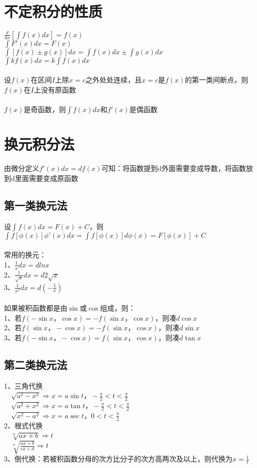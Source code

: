 \documentclass{article}
\begin{document}
\begin{flushleft}
	\section{不定积分的性质}
	
	$\frac{d}{dx}[\int f(x)dx]=f(x)$\\
	$\int F'(x)dx=F(x)$\\
	$\int [f(x)\pm g(x)]dx=\int f(x)dx \pm \int g(x)dx$\\
	$\int kf(x)dx=k\int f(x)dx$\\
	~\\
	设$f(x)$在区间$I$上除$x=c$之外处处连续，且$x=c$是$f(x)$的第一类间断点，则$f(x)$在$I$上没有原函数\\
	~\\
	$f(x)$是奇函数，则$\int f(x)dx$和$f'(x)$是偶函数\\
	
	\section{换元积分法}
	
	由微分定义$f'(x)dx=df(x)$可知：将函数提到d外面需要变成导数，将函数放到d里面需要变成原函数
	
	\subsection{第一类换元法}
	设$\int f(x)dx=F(x)+C$，则$\int f[\phi(x)]\phi'(x)dx=\int f[\phi(x)]d\phi(x)=F[\phi(x)]+C$\\
	~\\
	常用的换元：\\
	1、$\frac{1}{x}dx=dlnx$\\
	2、$\frac{1}{\sqrt{x}}dx=d2\sqrt{x}$\\
	3、$\frac{1}{x^2}dx=d(-\frac{1}{x})$\\
	~\\
	如果被积函数都是由$\sin$或$\cos$组成，则：\\
	1、若$f(-\sin x，\cos x)=-f(\sin x，\cos x)$，则凑$d\cos x$\\
	2、若$f(\sin x，-\cos x)=-f(\sin x，\cos x)$，则凑$d\sin x$\\
	3、若$f(-\sin x，-\cos x)=f(\sin x，\cos x)$，则凑$d\tan x$\\

	\subsection{第二类换元法}
	1、三角代换\\
	\ \ $\sqrt{a^2-x^2} \Rightarrow x=a\sin t， -\frac{\pi}{2}<t<\frac{\pi}{2}$\\
	\ \ $\sqrt{a^2+x^2} \Rightarrow x=a\tan t， -\frac{\pi}{2}<t<\frac{\pi}{2}$\\
	\ \ $\sqrt{x^2-a^2} \Rightarrow x=a\sec t， 0<t<\frac{\pi}{2}$\\
	2、根式代换\\
	\ \ $\sqrt[n]{ax+b} \Rightarrow t$\\
	\ \ $\sqrt[n]{\frac{ax+b}{cx+d}} \Rightarrow t$\\
	3、倒代换：若被积函数分母的次方比分子的次方高两次及以上，则代换为$x=\frac{1}{t}$\\
	

\end{flushleft}
\end{document}
